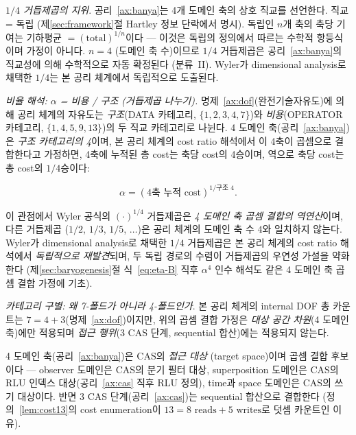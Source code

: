 \documentclass[entropy,article,submit,pdftex,oneauthor]{Definitions/mdpi}
\begin{document}
\textit{$1/4$ 거듭제곱의 지위}. 공리~\ref{ax:banya}는 4개 도메인 축의 상호 직교를 선언한다. 직교 = 독립 (제\ref{sec:framework}절 Hartley 정보 단락에서 명시). 독립인 $n$개 축의 축당 기여는 기하평균 $= (\text{total})^{1/n}$이다 --- 이것은 독립의 정의에서 따르는 수학적 항등식이며 가정이 아니다. $n = 4$ (도메인 축 수)이므로 $1/4$ 거듭제곱은 공리~\ref{ax:banya}의 직교성에 의해 수학적으로 자동 확정된다 (분류~II). Wyler가 dimensional analysis로 채택한 $1/4$는 본 공리 체계에서 독립적으로 도출된다.

\emph{비율 해석: $\alpha$ = 비용 / 구조 (거듭제곱 나누기).} 명제~\ref{ax:dof}(완전기술자유도)에 의해 공리 체계의 자유도는 \emph{구조}(DATA 카테고리, $\{1, 2, 3, 4, 7\}$)와 \emph{비용}(OPERATOR 카테고리, $\{1, 4, 5, 9, 13\}$)의 두 직교 카테고리로 나뉜다. 4 도메인 축(공리~\ref{ax:banya})은 \emph{구조 카테고리의 4}이며, 본 공리 체계의 cost ratio 해석에서 이 4축이 곱셈으로 결합한다고 가정하면, 4축에 누적된 총 cost는 축당 cost의 4승이며, 역으로 축당 cost는 총 cost의 $1/4$승이다:
\begin{linenomath}
\begin{equation}
\alpha = (\text{4축 누적 cost})^{1/\text{구조 4}}.
\label{eq:cost-ratio}
\end{equation}
\end{linenomath}
이 관점에서 Wyler 공식의 $(\cdot)^{1/4}$ 거듭제곱은 \emph{4 도메인 축 곱셈 결합의 역연산}이며, 다른 거듭제곱 ($1/2$, $1/3$, $1/5$, $\ldots$)은 공리 체계의 도메인 축 수 $4$와 일치하지 않는다. Wyler가 dimensional analysis로 채택한 $1/4$ 거듭제곱은 본 공리 체계의 cost ratio 해석에서 \emph{독립적으로 재발견}되며, 두 독립 경로의 수렴이 거듭제곱의 우연성 가설을 약화한다 (제\ref{sec:baryogenesis}절 식~\eqref{eq:eta-B} 직후 $\alpha^4$ 인수 해석도 같은 4 도메인 축 곱셈 결합 가정에 기초).

\textit{카테고리 구별: 왜 7-폴드가 아니라 4-폴드인가}. 본 공리 체계의 internal DOF 총 카운트는 $7 = 4 + 3$(명제~\ref{ax:dof})이지만, 위의 곱셈 결합 가정은 \emph{대상 공간 차원}(4 도메인 축)에만 적용되며 \emph{접근 행위}(3 CAS 단계, sequential 합산)에는 적용되지 않는다.

4 도메인 축(공리~\ref{ax:banya})은 CAS의 \emph{접근 대상} (target space)이며 곱셈 결합 후보이다 --- observer 도메인은 CAS의 분기 필터 대상, superposition 도메인은 CAS의 RLU 인덱스 대상(공리~\ref{ax:cas} 직후 RLU 정의), time과 space 도메인은 CAS의 쓰기 대상이다. 반면 3 CAS 단계(공리~\ref{ax:cas})는 sequential 합산으로 결합한다 (정의~\ref{lem:cost13}의 cost enumeration이 $13 = 8\text{ reads} + 5\text{ writes}$로 덧셈 카운트인 이유).
\end{document}
